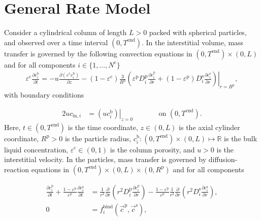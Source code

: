 \documentclass{article}
\begin{document}
\section*{General Rate Model}
Consider a cylindrical column of length $L > 0$ packed with spherical particles, and observed over a time interval $(0, T^{\mathrm{end}})$.
In the interstitial volume, mass transfer is governed by the following convection equations in $(0, T^\mathrm{end})\times (0, L)$ and for all components $i\in\{1, \dots, N^{\mathrm{c}} \}$
\begin{align}
\varepsilon^{\mathrm{c}} \frac{\partial c^{\mathrm{b}}_i}{\partial t} = - u \frac{\partial \left( \varepsilon^{\mathrm{c}} c^{\mathrm{b}}_i \right)}{\partial z}- \left(1 - \varepsilon^{\mathrm{c}} \right) \frac{3}{R^{\mathrm{p}}} \left( \varepsilon^{\mathrm{p}} D^{\mathrm{p}}_{i} \left. \frac{\partial c^{\mathrm{p}}_{i}}{\partial r} + (1 - \varepsilon^{\mathrm{p}}) D^{\mathrm{s}}_{i} \frac{\partial c^{\mathrm{s}}_{i}}{\partial r}\right)\right|_{r = R^{\mathrm{p}}},
\end{align}
with boundary conditions

\begin{alignat}{2}
u c_{\mathrm{in},i} &= \left.\left( u c^{\mathrm{b}}_i \right)\right|_{z=0} & &\qquad\text{on }(0, T^{\mathrm{end}}).
\end{alignat}
Here, $t\in (0, T^{\mathrm{end}})$ is the time coordinate, $z\in (0, L)$ is the axial cylinder coordinate, $R^\mathrm{p}> 0$ is the particle radius, $c^{\mathrm{b}}_i\colon (0, T^\mathrm{end})\times (0, L) \mapsto \mathbb{R}$ is the bulk liquid concentration, $\varepsilon^{\mathrm{c}}\in (0, 1)$ is the column porosity, and $u> 0$ is the interstitial velocity.
In the particles, mass transfer is governed by diffusion-reaction equations in $ (0, T^\mathrm{end}) \times (0, L)\times (0, R^{\mathrm{p}})$ and for all components

\begin{align}
\frac{\partial c^{\mathrm{p}}_{i}}{\partial t} + \frac{1 - \varepsilon^{\mathrm{p}}}{\varepsilon^{\mathrm{p}}} \frac{\partial c^{\mathrm{s}}_{i}}{\partial t}&= \frac{1}{r^2} \frac{\partial }{\partial r} \left( r^2 D_{i}^{\mathrm{p}} \frac{\partial c^{\mathrm{p}}_{i}}{\partial r} \right) - \frac{1 - \varepsilon^{\mathrm{p}}}{\varepsilon^{\mathrm{p}}} \frac{1}{r^2} \frac{\partial }{\partial r} \left( r^2 D_{i}^{\mathrm{s}} \frac{\partial c^{\mathrm{s}}_{i}}{\partial r} \right) , \\
0 &= f^{\mathrm{bind}}_{i}\left( \vec{c}^{\mathrm{p}}, \vec{c}^{\mathrm{s}} \right) ,
\end{align}
\end{document}
